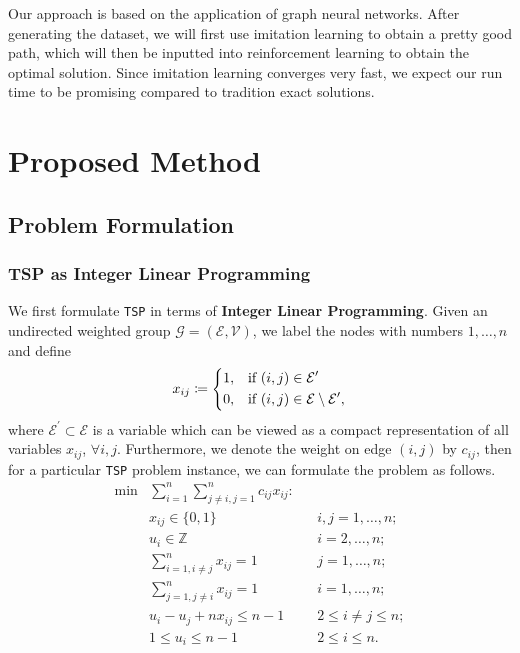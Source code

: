 \documentclass{article}
\begin{document}
Our approach is based on the application of graph neural networks. After generating the dataset, we will first use imitation learning to obtain a pretty good path, which will then be inputted into
reinforcement learning to obtain the optimal solution. Since imitation learning converges very fast, we expect our run time to be promising compared to tradition exact solutions.

\section{Proposed Method}
\subsection{Problem Formulation}
\subsubsection{TSP as Integer Linear Programming}
We first formulate \texttt{TSP} in terms of \textbf{Integer Linear Programming}. Given an undirected weighted group \(\mathcal{G} = (\mathcal{E}, \mathcal{V})\), we label the
nodes with numbers \(1, \ldots, n\) and define
\[
	x_{ij}\coloneqq \begin{dcases}
		1, & \text{if }(i, j)\in \mathcal{E}^\prime                       \\
		0, & \text{if } (i, j)\in \mathcal{E}\setminus\mathcal{E}^\prime,
	\end{dcases}
\]
where \(\mathcal{E}^\prime\subset \mathcal{E}\) is a variable which can be viewed as a compact representation of all variables \(x_{ij}\), \(\forall i, j\). Furthermore, we
denote the weight on edge \((i, j)\) by \(c_{ij}\), then for a particular \texttt{TSP} problem instance, we can formulate the problem as follows.
\begin{equation}\label{formula:TSP}
	\begin{aligned}
		\min & \sum _{i=1}^{n}\sum _{j\neq i,j=1}^{n}c_{ij}x_{ij}\colon &  &                      \\
		     & x_{ij}\in \{0,1\}                                        &  & i,j=1,\ldots ,n;     \\
		     & u_{i}\in \mathbb{Z}                                      &  & i=2,\ldots ,n;       \\
		     & \sum _{i=1,i\neq j}^{n}x_{ij}=1                          &  & j=1,\ldots ,n;       \\
		     & \sum _{j=1,j\neq i}^{n}x_{ij}=1                          &  & i=1,\ldots ,n;       \\
		     & u_{i}-u_{j}+nx_{ij}\leq n-1                              &  & 2\leq i\neq j\leq n; \\
		     & 1\leq u_{i}\leq n-1                                      &  & 2\leq i\leq n.
	\end{aligned}
\end{equation}
\end{document}

